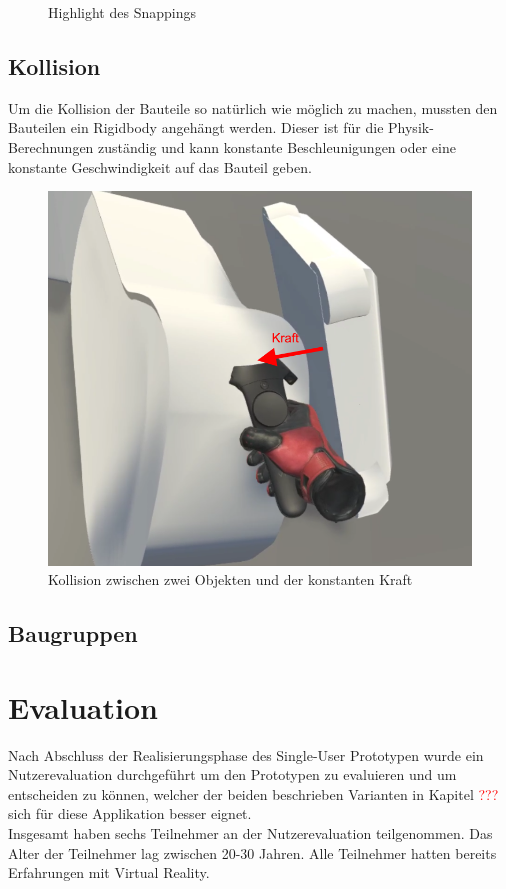 \begin{figure}[h!]
\begin{minipage}[b]{0.49\linewidth}
		\caption{Highlight des Snappings}
		\label{fig:snapping}
	\end{minipage}
\end{figure}

\subsection{Kollision}
Um die Kollision der Bauteile so natürlich wie möglich zu machen, mussten den Bauteilen ein Rigidbody angehängt werden. Dieser ist für die Physik-Berechnungen zuständig und kann konstante Beschleunigungen oder eine konstante Geschwindigkeit auf das Bauteil geben.


\begin{figure}[h!]
	\centering
	\includegraphics[keepaspectratio,width=0.4\linewidth]{img/Kollision.PNG}
	\caption{Kollision zwischen zwei Objekten und der konstanten Kraft}
	\label{fig:collision}
\end{figure}

\subsection{Baugruppen}

\section{Evaluation}
Nach Abschluss der Realisierungsphase des Single-User Prototypen wurde ein Nutzerevaluation durchgeführt um den Prototypen zu evaluieren und um entscheiden zu können, welcher der beiden beschrieben Varianten in Kapitel \textcolor{red}{???} sich für diese Applikation besser eignet. \\

\noindent Insgesamt haben sechs Teilnehmer an der Nutzerevaluation teilgenommen. Das Alter der Teilnehmer lag zwischen 20-30 Jahren. Alle Teilnehmer hatten bereits Erfahrungen mit Virtual Reality. \\

